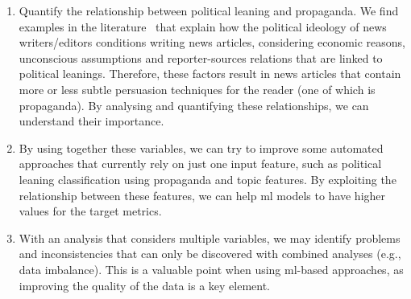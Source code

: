 \begin{enumerate}
    \item Quantify the relationship between political leaning and propaganda.
          We find examples in the literature~\citep{schudson2002news} that explain how the political ideology of news writers/editors conditions writing news articles, considering economic reasons, unconscious assumptions and reporter-sources relations that are linked to political leanings. Therefore, these factors result in news articles that contain more or less subtle persuasion techniques for the reader (one of which is propaganda). By analysing and quantifying these relationships, we can understand their importance.
    \item By using together these variables, we can try to improve some automated approaches that currently rely on just one input feature, such as political leaning classification
          using propaganda and topic features. By exploiting the relationship between these features, we can help \acrfull{ml} models to have higher values for the target metrics. %
    \item With an analysis that considers multiple variables, we may identify problems and inconsistencies that can only be discovered with combined analyses (e.g., data imbalance). This is a valuable point when using \acrshort{ml}-based approaches, as improving the quality of the data is a key element. %
\end{enumerate}
